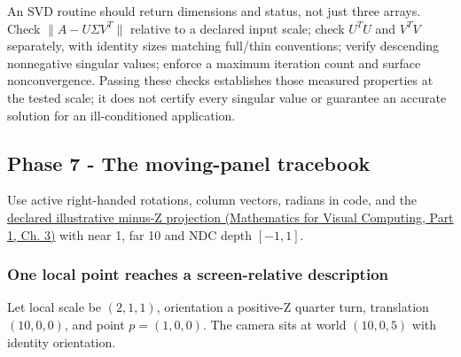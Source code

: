 An SVD routine should return dimensions and status, not just three arrays. Check \(\|A-U\Sigma V^T\|\) relative to a declared input scale; check \(U^TU\) and \(V^TV\) separately, with identity sizes matching full/thin conventions; verify descending nonnegative singular values; enforce a maximum iteration count and surface nonconvergence. Passing these checks establishes those measured properties at the tested scale; it does not certify every singular value or guarantee an accurate solution for an ill-conditioned application.

\subsection{Phase 7 - The moving-panel tracebook}\label{appendix-92ff77d4dfdc-phase-7---the-moving-panel-tracebook}

\hypertarget{appendix-92ff77d4dfdc-phase-7---the-moving-panel-tracebook}{}

Use active right-handed rotations, column vectors, radians in code, and the \href{../02-Mathematics-for-Visual-Computing-P01/main.pdf\#01-foundations-i-ch019-figure-m6---follow-one-point-through-named-spaces}{declared illustrative minus-Z projection (Mathematics for Visual Computing, Part 1, Ch. 3)} with near 1, far 10 and NDC depth \([-1,1]\).

\subsubsection{One local point reaches a screen-relative description}\label{appendix-92ff77d4dfdc-one-local-point-reaches-a-screen-relative-description}

\hypertarget{appendix-92ff77d4dfdc-one-local-point-reaches-a-screen-relative-description}{}

Let local scale be \((2,1,1)\), orientation a positive-Z quarter turn, translation \((10,0,0)\), and point \(p=(1,0,0)\). The camera sits at world \((10,0,5)\) with identity orientation.

